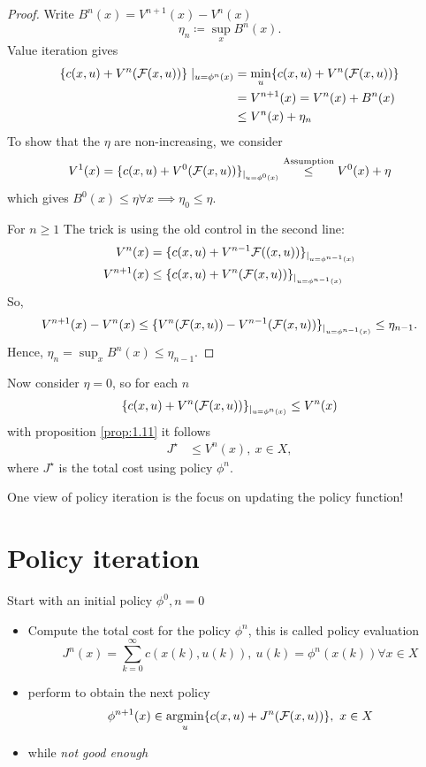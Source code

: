 \begin{proof}
    Write \(B^n(x)=V^{n+1}(x)-V^n(x)\)
    \[\eta_n\coloneqq \sup_x B^n(x).\]
    Value iteration gives 
    \begin{align*}
        \{c(x,u)+V^n(\mathcal{F}(x,u))\}\mid_{u=\phi^n(x)}&=\min_u\{c(x,u)+V^n(\mathcal{F}(x,u))\}\\
        &=V^{n+1}(x)=V^n(x)+B^n(x)\\
        &\leq V^n(x)+\eta_n 
    \end{align*}
    To show that the \(\eta\) are non-increasing, we consider 
    \begin{align*}
        V^1(x)=\{c(x,u)+V^0(\mathcal{F}(x,u))\}_{|_{u=\phi^0(x)}}\stackrel{\text{Assumption}}{\leq} V^0(x)+\eta
    \end{align*}
    which gives \(B^0(x)\leq \eta\forall x\implies\eta_0\leq \eta\).

    For \(n\geq 1\) 
    The trick is using the old control in the second line:
    \begin{align*}
        V^n(x)&=\{c(x,u)+V^{n-1}\mathcal{F}((x,u))\}_{|_{u=\phi^{n-1}(x)}}\\
        V^{n+1}(x) &\leq \{c(x,u)+V^n(\mathcal{F}(x,u))\}_{|_{u=\phi^{n-1}(x)}}
    \end{align*}
    So, 
    \[V^{n+1}(x)-V^{n}(x)\leq \{V^n(\mathcal{F}(x,u))-V^{n-1}(\mathcal{F}(x,u))\}_{|_{u=\phi^{n-1}(x)}}\leq \eta_{n-1}.\]
    Hence, \(\eta_n=\sup_x B^n(x)\leq \eta_{n-1}\).
\end{proof}

Now consider \(\eta=0\), so for each \(n\)
\begin{align*}
    \{c(x,u)+V^n(\mathcal{F}(x,u))\}_{|_{u=\phi^n(x)}}\leq V^n(x)
\end{align*}
with proposition \ref{prop:1.11} it follows 
\begin{align*}
    J^\star &\leq V^n(x),\ x\in X,   
\end{align*}
where \(J^\star\) is the total cost using policy \(\phi^n\).

One view of policy iteration is the focus on updating the policy function!

\section{Policy iteration}

Start with an initial policy \(\phi^0,n=0\)
\begin{itemize}
    \item Compute the total cost for the policy \(\phi^n\), this is called policy evaluation
    \[J^n(x)=\sum_{k=0}^\infty c(x(k),u(k)),\ u(k)=\phi^n(x(k))\forall x\in X\]
    \item perform  to obtain the next policy 
    \[\phi^{n+1}(x)\in \operatorname*{\text{argmin}}_{u}\{c(x,u)+J^n(\mathcal{F}(x,u))\},\ x\in X\]
    \item while \textit{not good enough}
\end{itemize}

